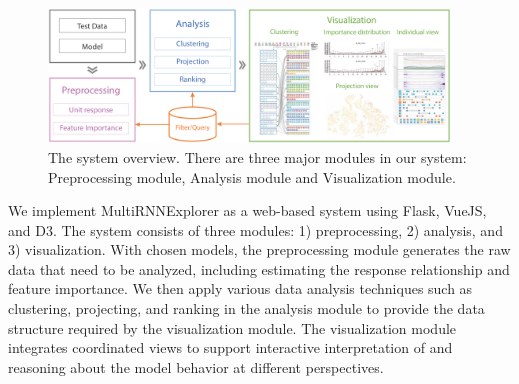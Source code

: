 \begin{figure}[t]
	\centering
    \includegraphics[width=0.95\textwidth]{figure/MultiRNNExplorer/System_framework.pdf}
	\vspace{-3mm}
	\caption{The system overview. There are three major modules in our system: Preprocessing module, Analysis module and Visualization module. 
	}
	\label{fig:system_framework}
	\vspace{-1mm}
\end{figure}


We implement MultiRNNExplorer as a web-based system using Flask, VueJS, and D3. 
The system consists of three modules: 1) preprocessing, 2) analysis, and 3) visualization.
With chosen models, the preprocessing module generates the raw data that need to be analyzed, including estimating the response relationship and feature importance.
We then apply various data analysis techniques such as clustering, projecting, and ranking in the analysis module to provide the data structure required by the visualization module.
The visualization module integrates coordinated views to support interactive interpretation of and reasoning about the model behavior at different perspectives. 



